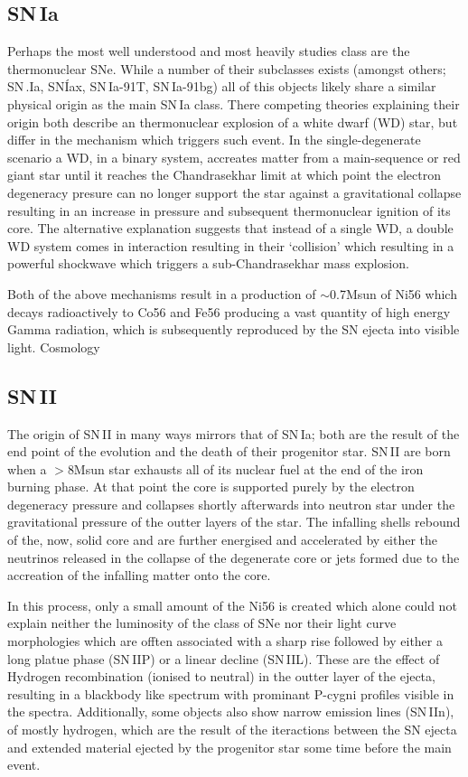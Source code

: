 \subsection{SN\,Ia}
Perhaps the most well understood and most heavily studies class are the thermonuclear SNe. While a number of their subclasses exists (amongst others; SN\,.Ia, SN\'Iax, SN\,Ia-91T, SN\,Ia-91bg) all of this objects likely share a similar physical origin as the main SN\,Ia class. There competing theories explaining their origin both describe an thermonuclear explosion of a white dwarf (WD) star, but differ in the mechanism which triggers such event. In the single-degenerate scenario a WD, in a binary system, accreates matter from a main-sequence or red giant star until it reaches the Chandrasekhar limit at which point the electron degeneracy presure can no longer support the star against a gravitational collapse resulting in an increase in pressure and subsequent thermonuclear ignition of its core. The alternative explanation suggests that instead of a single WD, a double WD system comes in interaction resulting in their `collision' which resulting in a powerful shockwave which triggers a sub-Chandrasekhar mass explosion.

Both of the above mechanisms result in a production of $\sim$0.7Msun of Ni56 which decays radioactively to Co56 and Fe56 producing a vast quantity of high energy Gamma radiation, which is subsequently reproduced by the SN ejecta into visible light. Cosmology


\subsection{SN\,II}
The origin of SN\,II in many ways mirrors that of SN\,Ia; both are the result of the end point of the evolution and the death of their progenitor star. SN\,II are born when a $>$8Msun star exhausts all of its nuclear fuel at the end of the iron burning phase. At that point the core is supported purely by the electron degeneracy pressure and collapses shortly afterwards into neutron star under the gravitational pressure of the outter layers of the star. The infalling shells rebound of the, now, solid core and are further energised and accelerated by either the neutrinos released in the collapse of the degenerate core or jets formed due to the accreation of the infalling matter onto the core.

In this process, only a small amount of the Ni56 is created which alone could not explain neither the luminosity of the class of SNe nor their light curve morphologies which are offten associated with a sharp rise followed by either a long platue phase (SN\,IIP) or a linear decline (SN\,IIL). These are the effect of Hydrogen recombination (ionised to neutral) in the outter layer of the ejecta, resulting in a blackbody like spectrum with prominant P-cygni profiles visible in the spectra. Additionally, some objects also show narrow emission lines (SN\,IIn), of mostly hydrogen, which are the result of the iteractions between the SN ejecta and extended material ejected by the progenitor star some time before the main event.

